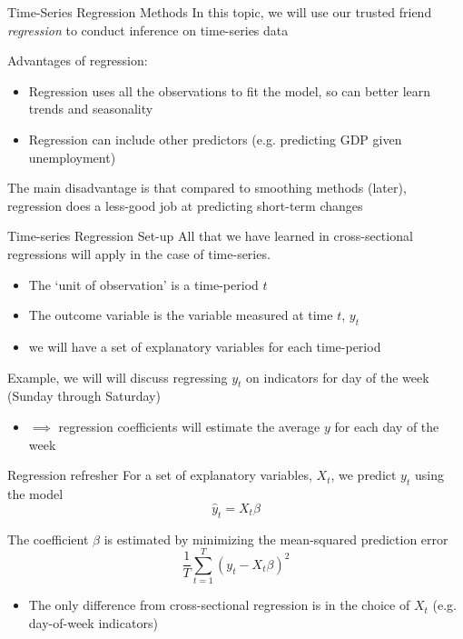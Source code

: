 \documentclass[aspectratio=169,t,11pt,table]{beamer}
\begin{document}
\begin{frame}{Time-Series Regression Methods}
  In this topic, we will use our trusted friend \emph{regression} to conduct inference on time-series data

  \bigskip
  Advantages of regression:
  \begin{itemize}
    \item Regression uses all the observations to fit the model, so can better learn trends and seasonality
    
    \item Regression can include other predictors (e.g. predicting GDP given unemployment)
  \end{itemize}

  \bigskip
  The main disadvantage is that compared to smoothing methods (later), regression does a less-good job at predicting short-term changes 
\end{frame}

\begin{frame}{Time-series Regression Set-up}
  All that we have learned in cross-sectional regressions will apply in the case of time-series. 
  \begin{itemize}
    \item The `unit of observation' is a time-period $t$
    \item The outcome variable is the variable measured at time $t$, $y_t$
    \item we will have a set of explanatory variables for each time-period
  \end{itemize}

  \bigskip
  Example, we will will discuss regressing $y_t$ on indicators for day of the week (Sunday through Saturday)
  \begin{itemize}
    \item $\implies$ regression coefficients will estimate the average $y$ for each day of the week
  \end{itemize}
\end{frame}

\begin{frame}{Regression refresher}
  For a set of explanatory variables, $X_t$, we predict $y_t$ using the model
  $$
    \hat{y}_t = X_t \beta
  $$

  \bigskip
  The coefficient $\beta$ is estimated by minimizing the mean-squared prediction error
  $$
    \frac{1}{T} \sum_{t=1}^T (y_t - X_t \beta)^2
  $$
  \begin{itemize}
    \item The only difference from cross-sectional regression is in the choice of $X_t$ (e.g. day-of-week indicators)
  \end{itemize}
\end{frame}
\end{document}
